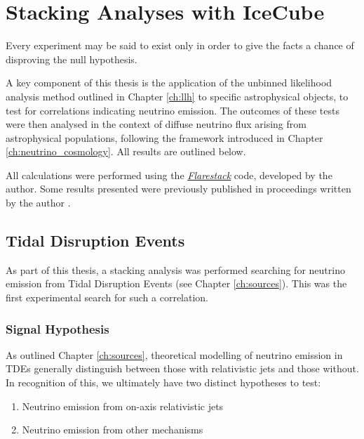 \setchapterpreamble[u]{\margintoc}
\chapter{Stacking Analyses with IceCube}
\begin{fquote}Every experiment may be said to exist only in order to give the facts a chance of disproving the null hypothesis.
\end{fquote}

A key component of this thesis is the application of the unbinned likelihood analysis method outlined in Chapter \ref{ch:llh} to specific astrophysical objects, to test for correlations indicating neutrino emission. The outcomes of these tests were then analysed in the context of diffuse neutrino flux arising from astrophysical populations, following the framework introduced in Chapter \ref{ch:neutrino_cosmology}. All results are outlined below.

All calculations were  performed using the \emph{\href{https://github.com/IceCubeOpenSource/flarestack}{Flarestack}} code, developed by the author. Some results presented were previously published in proceedings written by the author .

\section{Tidal Disruption Events}

As part of this thesis, a stacking analysis was performed searching for neutrino emission from Tidal Disruption Events (see Chapter \ref{ch:sources}). This was the first experimental search for such a correlation. 

\subsection{Signal Hypothesis}

As outlined Chapter \ref{ch:sources}, theoretical modelling of neutrino emission in TDEs generally distinguish between those with relativistic jets and those without. In recognition of this, we ultimately have two distinct hypotheses to test:

\begin{enumerate}
	\item Neutrino emission from on-axis relativistic jets
	\item Neutrino emission from other mechanisms
\end{enumerate}


